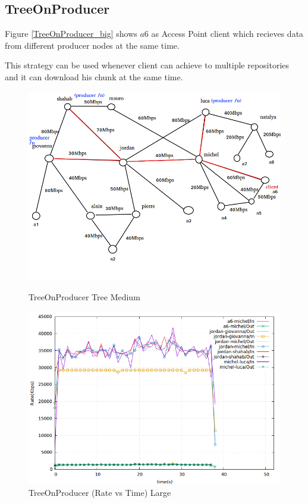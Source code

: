 \subsection{TreeOnProducer}
Figure \ref{TreeOnProducer_big} shows $a6$ as Access Point client which recieves data from different producer nodes at the same time.

This strategy can be used whenever client can achieve to multiple repositories and it can download his chunk at the same time.

\begin{figure}[H]

\begin{center}

\includegraphics[scale = 0.4]{Figures/TreeOnProducer_big.png}

\caption{TreeOnProducer Tree Medium} \label{TreeOnProducer_big} 


\includegraphics[scale = 0.4]{Figures/treeonproducer_big.png}

\caption{TreeOnProducer (Rate vs Time) Large} \label{treeonproducer_big} 


\end{center}

\end{figure}


